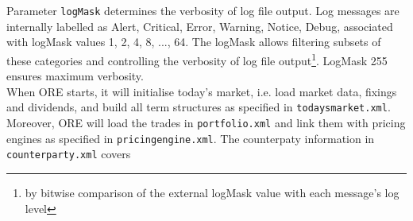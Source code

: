 Parameter {\tt logMask} determines the verbosity of log file output. Log messages are 
internally labelled as Alert, Critical, Error, Warning, Notice, Debug, associated with logMask values 1, 2, 4, 8, ..., 64. 
The logMask allows filtering subsets of these categories and controlling the verbosity of log file output\footnote{by bitwise comparison of the external logMask value with each message's log level}. LogMask 255 ensures maximum verbosity. \\

When ORE starts, it will initialise today's market, i.e. load market data, fixings and dividends, and build all term
structures as specified in {\tt todaysmarket.xml}.  Moreover, ORE will load the trades in {\tt portfolio.xml} and link
them with pricing engines as specified in {\tt pricingengine.xml}. The counterpaty information in {\tt counterparty.xml} covers
